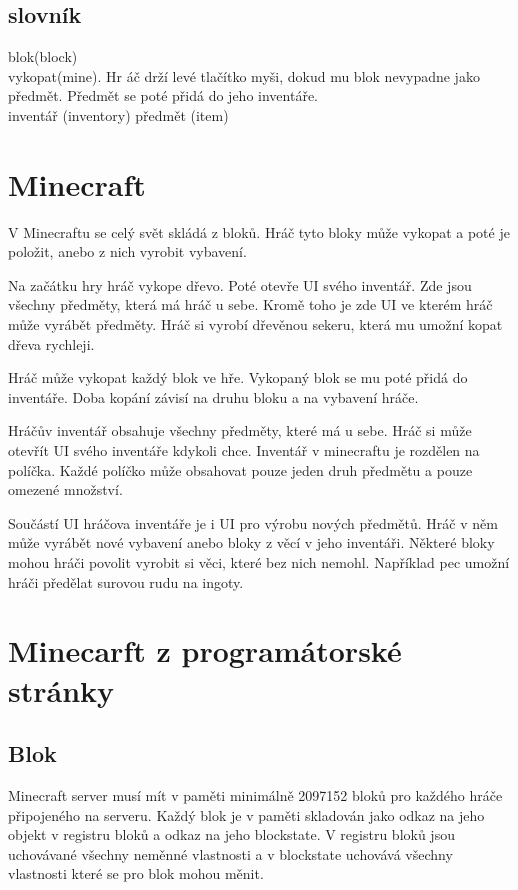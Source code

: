 \documentclass[FM,RP]{tulthesis}
\begin{document}

\section{slovník}
blok(block) \\
vykopat(mine). Hr áč drží levé tlačítko myši, dokud mu blok nevypadne jako předmět. Předmět se poté přidá do jeho inventáře.\\
inventář (inventory) 
předmět (item)


\chapter{Minecraft}
V Minecraftu se celý svět skládá z bloků. Hráč tyto bloky může vykopat a poté je položit, anebo z nich vyrobit vybavení.
\par
Na začátku hry hráč vykope dřevo. Poté otevře UI svého inventář. Zde jsou všechny předměty, která má hráč u sebe. Kromě toho je zde UI ve kterém hráč může vyrábět předměty. Hráč si vyrobí dřevěnou sekeru, která mu umožní kopat dřeva rychleji.
\par
Hráč může vykopat každý blok ve hře. Vykopaný blok se mu poté přidá do inventáře. Doba kopání závisí na druhu bloku a na vybavení hráče.
\par
Hráčův inventář obsahuje všechny předměty, které má u sebe. Hráč si může otevřít UI svého inventáře kdykoli chce. Inventář v minecraftu je rozdělen na políčka. Každé políčko může obsahovat pouze jeden druh předmětu a pouze omezené množství.
\par
Součástí UI hráčova inventáře je i UI pro výrobu nových předmětů. Hráč v něm může vyrábět nové vybavení anebo bloky z věcí v jeho inventáři. Některé bloky mohou hráči povolit vyrobit si věci, které bez nich nemohl. Například pec umožní hráči předělat surovou rudu na ingoty.  

\chapter{Minecarft z programátorské stránky}
\section{Blok}
Minecraft server musí mít v paměti minimálně 2097152 bloků pro každého hráče připojeného na serveru. Každý blok je v paměti skladován jako odkaz na jeho objekt v registru bloků a odkaz na jeho blockstate. V registru bloků jsou uchovávané všechny neměnné vlastnosti a v blockstate uchovává všechny vlastnosti které se pro blok mohou měnit. 
\end{document}
